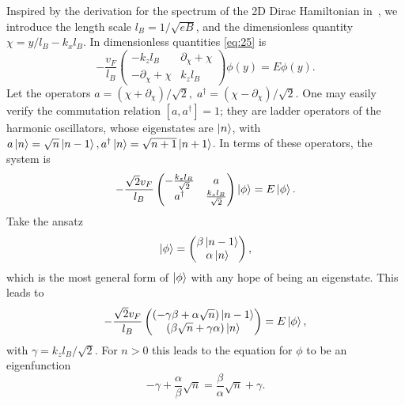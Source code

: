 Inspired by the derivation for the spectrum of the 2D Dirac Hamiltonian in~\cite{wehlingDiracMaterials2014}, we introduce the length scale $l_B = 1 /\sqrt{eB}$, and the dimensionless quantity $\chi = y /l_{B} - k_x l_{B}$.
In dimensionless quantities \cref{eq:25} is
\begin{equation}
  -\frac{{ v_F}}{l_{B}}
  \begin{pmatrix}
    -k_z l_B & \partial _{\chi } + \chi \\
    -\partial _{\chi } + \chi & k_z l_B
  \end{pmatrix}
  \phi(y)  =  E \phi(y).
\end{equation}
Let the operators \(a = \left( \chi + \partial _{\chi } \right) / \sqrt{2},\; a^{\dagger} = \left( \chi - \partial _{\chi } \right) /\sqrt{2}\).
One may easily verify the commutation relation $[a, a^{\dagger}] = 1$;
they are ladder operators of the harmonic oscillators, whose eigenstates are $\ket{n}$, with $a\ket{n} = \sqrt{n}\ket{n-1}, a^{\dagger} \ket{n} = \sqrt{n+1} \ket{n+1}$.
In terms of these operators, the system is
\begin{equation}
  -\frac{\sqrt{2}  v_F}{l_B}
  \begin{pmatrix}
    -\frac{k_zl_B}{\sqrt{2}} & a\\
    a^{\dagger} & \frac{k_zl_B}{\sqrt{2}}
  \end{pmatrix}
  \ket{\phi } = E \ket{\phi }.
\end{equation}
Take the ansatz
\begin{equation}
  \ket{\phi } =
  \begin{pmatrix}
    \beta \ket{n-1}\\
    \alpha  \ket{n}
  \end{pmatrix},
\end{equation}
which is the most general form of $\ket{\phi }$ with any hope of being an eigenstate.
This leads to
\begin{equation}
  -\frac{\sqrt{2}  v_F}{l_B}
  \begin{pmatrix}
    \left( -\gamma \beta + \alpha \sqrt{n} \right) \ket{n-1}\\
    \left( \beta \sqrt{n} + \gamma \alpha \right) \ket{n}
  \end{pmatrix}
  = E \ket{\phi },
\end{equation}
with $\gamma  = k_zl_B / \sqrt{2}$.
For $n > 0$ this leads to the equation for $\phi $ to be an eigenfunction
\begin{equation}
  -\gamma + \frac{\alpha}{\beta } \sqrt{n} = \frac{\beta }{\alpha } \sqrt{n} + \gamma.
\end{equation}
